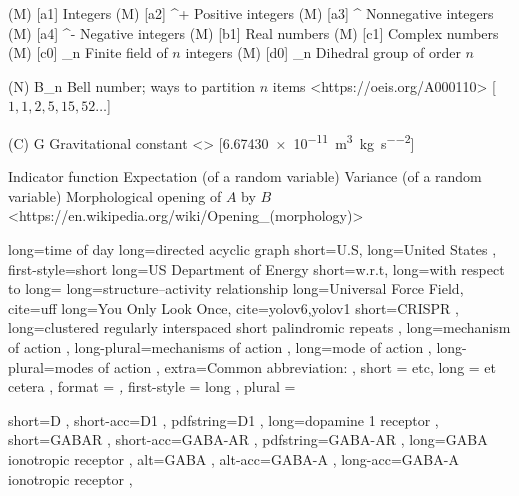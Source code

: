 \NomMath (M) [a1] {\Z} {Integers}
\NomMath (M) [a2] {\Z^+} {Positive integers}
\NomMath (M) [a3] {\Z^{}} {Nonnegative integers}
\NomMath (M) [a4] {\Z^-} {Negative integers}
\NomMath (M) [b1] {\Z} {Real numbers}
\NomMath (M) [c1] {\C} {Complex numbers}
\NomMath (M) [c0] {\Z_n} {Finite field of $n$ integers}
\NomMath (M) [d0] {_n} {Dihedral group of order $n$}


\NomMath (N) {B_n} {Bell number; ways to partition $n$ items}
    <https://oeis.org/A000110>
    [{$1, 1, 2, 5, 15, 52 \ldots$}]

\NomMath (C) {G} {Gravitational constant}
    <>
    [\qty{6.67430e-11}{\meter\cubed\per\kilogram\per\second\squared}]

\NomMath {\indicator} {Indicator function}
 {Expectation (of a random variable)}
 {Variance (of a random variable)}
    {Morphological opening of $A$ by $B$}
    <https://en.wikipedia.org/wiki/Opening\_(morphology)>




 {long=time of day}  %
 {long=directed acyclic graph}
 {
    short=U.S\acdot ,
    long=United States ,
    first-style=short     %
}
 {long=\acs{US} Department of Energy}
 {short=w.r.t\acdot, long=with respect to}
 {long=}
 {long=structure–activity relationship}  %
 {long=Universal Force Field, cite=uff}
 {long=You Only Look Once, cite={yolov6,yolov1}}
 {
    short=CRISPR ,
    long=clustered regularly interspaced short palindromic repeats ,
}
 {
    long=mechanism of action ,
	long-plural=mechanisms of action ,
}
 {
    long=mode of action ,
	long-plural=modes of action ,
	extra={Common abbreviation: } ,
}
 {
    short = etc\acdot ,
    long = et cetera ,
    format = \textit ,
    first-style = long ,
    plural =
}

 {
    short=D ,
    short-acc=D1 ,
    pdfstring=D1 ,
    long=dopamine 1 receptor ,
}
 {
    short=GABAR ,
    short-acc=GABA-AR ,
    pdfstring=GABA-AR ,
    long=GABA ionotropic receptor ,
    alt=GABA ,
    alt-acc=GABA-A ,
    long-acc=GABA-A ionotropic receptor ,
}

